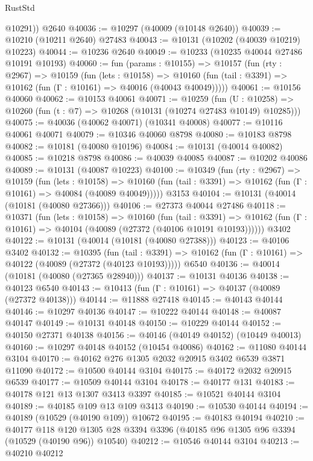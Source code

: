 \begin{lexlean}{RustStd}
\begin{coremodule}
        @10291))
    @2640
@40036 := @10297 (@40009 (@10148 @2640))
@40039 := @10210 (@10211 @2640) @27483
@40043 := @10131 (@10202 (@40039 @10219) @10223)
@40044 := @10236 @2640
@40049 := @10233 (@10235 @40044 @27486 @10191 @10193)
@40060 := fun (params : @10155) =>
  @10157
    (fun (rty : @2967) =>
    @10159
      (fun (lets : @10158) =>
      @10160 (fun (tail : @3391) => @10162 (fun (Γ : @10161) => @40016 (@40043 @40049)))))
@40061 := @10156 @40060
@40062 := @10153 @40061
@40071 := @10259
    (fun (U : @10258) => @10260 (fun (t : @7) => @10268 (@10131 (@10274 @27483 @10149) @10285)))
@40075 := @40036 (@40062 @40071) (@10341 @40008)
@40077 := @10116 @40061 @40071
@40079 := @10346 @40060 @8798
@40080 := @10183 @8798
@40082 := @10181 (@40080 @10196)
@40084 := @10131 (@40014 @40082)
@40085 := @10218 @8798
@40086 := @40039 @40085
@40087 := @10202 @40086
@40089 := @10131 (@40087 @10223)
@40100 := @10349
    (fun (rty : @2967) =>
    @10159
      (fun (lets : @10158) =>
      @10160 (fun (tail : @3391) => @10162 (fun (Γ : @10161) => @40084 (@40089 @40049)))))
    @3153
@40104 := @10131 (@40014 (@10181 (@40080 @27366)))
@40106 := @27373 @40044 @27486
@40118 := @10371
    (fun (lets : @10158) =>
    @10160
      (fun (tail : @3391) =>
      @10162 (fun (Γ : @10161) => @40104 (@40089 (@27372 (@40106 @10191 @10193))))))
    @3402
@40122 := @10131 (@40014 (@10181 (@40080 @27388)))
@40123 := @40106 @3402
@40132 := @10395
    (fun (tail : @3391) => @10162 (fun (Γ : @10161) => @40122 (@40089 (@27372 (@40123 @10193)))))
    @6540
@40136 := @40014 (@10181 (@40080 (@27365 @28940)))
@40137 := @10131 @40136
@40138 := @40123 @6540
@40143 := @10413 (fun (Γ : @10161) => @40137 (@40089 (@27372 @40138)))
@40144 := @11888 @27418
@40145 := @40143 @40144
@40146 := @10297 @40136
@40147 := @10222 @40144
@40148 := @40087 @40147
@40149 := @10131 @40148
@40150 := @10229 @40144
@40152 := @40150 @27371 @40138
@40156 := @40146 (@40149 @40152) (@10449 @40013)
@40160 := @10297 @40148 @40152 (@10454 @40086)
@40162 := @11080 @40144 @3104
@40170 := @40162 @276 @1305 @2032 @20915 @3402 @6539 @3871 @11090
@40172 := @10500 @40144 @3104
@40175 := @40172 @2032 @20915 @6539
@40177 := @10509 @40144 @3104
@40178 := @40177 @131
@40183 := @40178 @121 @13 @1307 @3413 @3397
@40185 := @10521 @40144 @3104
@40189 := @40185 @109 @13 @109 @3413
@40190 := @10530 @40144
@40194 := @40189 (@10529 (@40190 @109)) @10672
@40195 := @40183 @40194
@40210 := @40177
    @118
    @120
    @1305
    @28
    @3394
    @3396
    (@40185 @96 @1305 @96 @3394 (@10529 (@40190 @96)) @10540)
@40212 := @10546 @40144 @3104
@40213 := @40210 @40212

\end{coremodule}
\end{lexlean}
